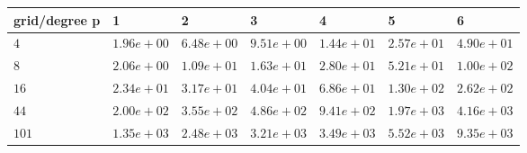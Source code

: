 \begin{tabular}{lllllll}
\hline
 grid/degree p   & 1          & 2          & 3          & 4          & 5          & 6          \\
\hline
 $4$             & $1.96e+00$ & $6.48e+00$ & $9.51e+00$ & $1.44e+01$ & $2.57e+01$ & $4.90e+01$ \\
 $8$             & $2.06e+00$ & $1.09e+01$ & $1.63e+01$ & $2.80e+01$ & $5.21e+01$ & $1.00e+02$ \\
 $16$            & $2.34e+01$ & $3.17e+01$ & $4.04e+01$ & $6.86e+01$ & $1.30e+02$ & $2.62e+02$ \\
 $44$            & $2.00e+02$ & $3.55e+02$ & $4.86e+02$ & $9.41e+02$ & $1.97e+03$ & $4.16e+03$ \\
 $101$           & $1.35e+03$ & $2.48e+03$ & $3.21e+03$ & $3.49e+03$ & $5.52e+03$ & $9.35e+03$ \\
\hline
\end{tabular}